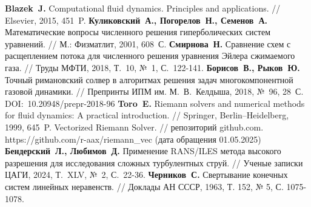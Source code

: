 \begin{thebibliography}{99}
\textbf{Blazek~J.} Computational fluid dynamics. Principles and applications. // Elsevier, 2015, 451~P.
\textbf{Куликовский~А., Погорелов~Н., Семенов~А.} Математические вопросы численного решения гиперболических систем уравнений. // М.: Физматлит, 2001, 608~С.
\textbf{Смирнова~Н.} Сравнение схем с расщеплением потока для численного решения уравнения Эйлера сжимаемого газа. // Труды МФТИ, 2018, Т.~10, №~1, С.~122-141.
\textbf{Борисов~В., Рыков~Ю.} Точный римановский солвер в алгоритмах решения задач многокомпонентной газовой динамики. // Препринты ИПМ им. М.~В.~Келдыша, 2018, №~96, 28~С. DOI:~10.20948/prepr-2018-96
\textbf{Toro~E.} Riemann solvers and numerical methods for fluid dynamics: A practical introduction. // Springer, Berlin–Heidelberg, 1999, 645~P.
Vectorized Riemann Solver. // репозиторий github.com. https://github.com/r-aax/riemann\_vec (дата обращения 01.05.2025)
\textbf{Бендерский~Л., Любимов~Д.} Применение RANS/ILES метода высокого разрешения для исследования сложных турбулентных струй. // Ученые записки ЦАГИ, 2024, Т.~XLV, №~2, С.~22-36. 
\textbf{Черников~С.} Свертывание конечных систем линейных неравенств. // Доклады АН СССР, 1963, Т. 152, № 5, С. 1075-1078.


\end{thebibliography}

